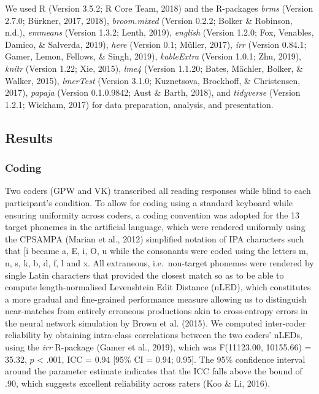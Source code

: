 \documentclass[doc,floatsintext]{apa6}
\begin{document}
We used R (Version 3.5.2; R Core Team, 2018) and the R-packages
\emph{brms} (Version 2.7.0; Bürkner, 2017, 2018), \emph{broom.mixed}
(Version 0.2.2; Bolker \& Robinson, n.d.), \emph{emmeans} (Version
1.3.2; Lenth, 2019), \emph{english} (Version 1.2.0; Fox, Venables,
Damico, \& Salverda, 2019), \emph{here} (Version 0.1; Müller, 2017),
\emph{irr} (Version 0.84.1; Gamer, Lemon, Fellows, \& Singh, 2019),
\emph{kableExtra} (Version 1.0.1; Zhu, 2019), \emph{knitr} (Version
1.22; Xie, 2015), \emph{lme4} (Version 1.1.20; Bates, Mächler, Bolker,
\& Walker, 2015), \emph{lmerTest} (Version 3.1.0; Kuznetsova, Brockhoff,
\& Christensen, 2017), \emph{papaja} (Version 0.1.0.9842; Aust \& Barth,
2018), and \emph{tidyverse} (Version 1.2.1; Wickham, 2017) for data
preparation, analysis, and presentation.

\subsection{Results}\label{results}

\subsubsection{Coding}\label{coding}

Two coders (GPW and VK) transcribed all reading responses while blind to
each participant's condition. To allow for coding using a standard
keyboard while ensuring uniformity across coders, a coding convention
was adopted for the 13 target phonemes in the artificial language, which
were rendered uniformly using the CPSAMPA (Marian et al., 2012)
simplified notation of IPA characters such that
{[}i\textipa{U}{]} became a, E, i, O, u
while the consonants were coded using the letters m, n, s, k, b, d, f, l
and x. All extraneous, i.e.~non-target phonemes were rendered by single
Latin characters that provided the closest match so as to be able to
compute length-normalised Levenshtein Edit Distance (nLED), which
constitutes a more gradual and fine-grained performance measure allowing
us to distinguish near-matches from entirely erroneous productions akin
to cross-entropy errors in the neural network simulation by Brown et al.
(2015). We computed inter-coder reliability by obtaining intra-class
correlations between the two coders' nLEDs, using the \emph{irr}
R-package (Gamer et al., 2019), which was F(11123.00, 10155.66) = 35.32,
\(p\) \textless{} .001, ICC = 0.94 {[}95\% CI = 0.94; 0.95{]}. The 95\%
confidence interval around the parameter estimate indicates that the ICC
falls above the bound of .90, which suggests excellent reliability
across raters (Koo \& Li, 2016).
\end{document}
